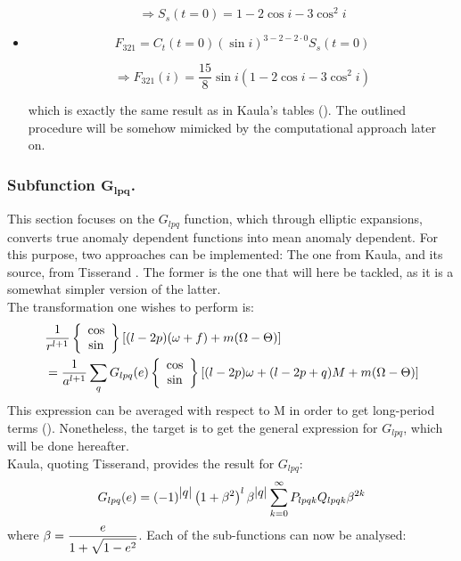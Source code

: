 \begin{itemize}
\begin{equation}
			\label{eqs:s=2}
			\end{equation}
			\begin{equation}
			\Longrightarrow S_s(t = 0) = 1 - 2\cos i - 3 \cos^2 i
			\label{eq:S_s_t=0}
			\end{equation}
			\item[\GMVred{Step 5. }] 
			\[
			F_{321} = C_t(t = 0) \left(\sin i\right)^{3 - 2 - 2\cdot 0} S_s(t = 0)
			\]
			\begin{GMVbox} 
			\begin{equation}
			\Longrightarrow F_{321}(i) = \dfrac{15}{8} \sin i \left( 1 - 2 \cos i - 3 \cos^2 i\right)
			\end{equation}
			\end{GMVbox}
			\noindent which is exactly the same result as in Kaula's tables (\cite[][p.34-35]{Kaula}). The outlined procedure will be somehow mimicked by the computational approach later on.
		\end{itemize}
		\subsubsection{Subfunction $\bm{G_{lpq}}$.}
		\indent This section focuses on the $G_{lpq}$ function, which through elliptic expansions, converts true anomaly dependent functions into mean anomaly dependent. For this purpose, two approaches can be implemented: The one from Kaula, and its source, from Tisserand \cite{Tisserand}. The former is the one that will here be tackled, as it is a somewhat simpler version of the latter. \\
		\indent The transformation one wishes to perform is:
		\begin{alignat}{4}
		& \nonumber \dfrac{1}{r^{l+1}} 
		\left\{\begin{array}{c}
		\cos \\
		\sin 
		\end{array}\right\}
		\left[ (l - 2p) (\omega + f) + m(\Omega - \Theta) \right] \\
		& = \dfrac{1}{a^{l+1}} \displaystyle\sum_{q} G_{lpq}(e) 
		 \label{eq:G_lpq_conv}\left\{\begin{array}{c}
		\cos \\
		\sin 
		\end{array}\right\}
		\left[ (l - 2p)\omega + (l - 2p + q) M + m(\Omega - \Theta) \right]
		\end{alignat}
		\indent This expression can be averaged with respect to M in order to get long-period terms (\cite[eq. 3.66][]{Kaula}). Nonetheless, the target is to get the general expression for $G_{lpq}$, which will be done hereafter.\\
		\indent Kaula, quoting Tisserand, provides the result for $G_{lpq}$:
		\begin{equation}
		G_{lpq}(e) = (-1)^{\mbox{$\left\lvert q \right\rvert$}}\left( 1 + \beta^2\right)^l \beta^{\mbox{$\left\lvert q \right\rvert$}} \displaystyle\sum_{k=0}^\infty P_{lpqk} Q_{lpqk} \beta^{2k}
		\label{eq:G_lpq_Kaula}
		\end{equation}
		\noindent where $\beta = \dfrac{e}{1 + \displaystyle\sqrt{1 - e^2}}$. Each of the sub-functions can now be analysed:
